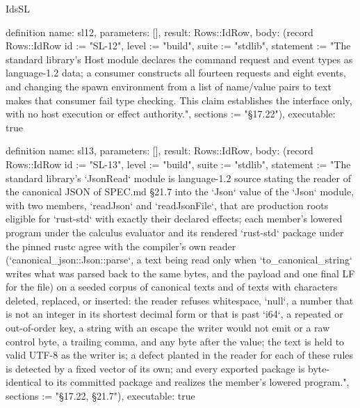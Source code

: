 \begin{lexlean}{IdsSL}
\begin{semanticmodule}
definition{
  name: sl12,
  parameters: [],
  result: Rows::IdRow,
  body: (record Rows::IdRow {id := "SL-12", level := "build", suite := "stdlib", statement := "The standard library's Host module declares the command request and event types as language-1.2 data; a consumer constructs all fourteen requests and eight events, and changing the spawn environment from a list of name/value pairs to text makes that consumer fail type checking. This claim establishes the interface only, with no host execution or effect authority.", sections := "§17.22"}),
  executable: true
}

definition{
  name: sl13,
  parameters: [],
  result: Rows::IdRow,
  body: (record Rows::IdRow {id := "SL-13", level := "build", suite := "stdlib", statement := "The standard library's `JsonRead` module is language-1.2 source stating the reader of the canonical JSON of SPEC.md §21.7 into the `Json` value of the `Json` module, with two members, `readJson` and `readJsonFile`, that are production roots eligible for `rust-std` with exactly their declared effects; each member's lowered program under the calculus evaluator and its rendered `rust-std` package under the pinned rustc agree with the compiler's own reader (`canonical_json::Json::parse`, a text being read only when `to_canonical_string` writes what was parsed back to the same bytes, and the payload and one final LF for the file) on a seeded corpus of canonical texts and of texts with characters deleted, replaced, or inserted: the reader refuses whitespace, `null`, a number that is not an integer in its shortest decimal form or that is past `i64`, a repeated or out-of-order key, a string with an escape the writer would not emit or a raw control byte, a trailing comma, and any byte after the value; the text is held to valid UTF-8 as the writer is; a defect planted in the reader for each of these rules is detected by a fixed vector of its own; and every exported package is byte-identical to its committed package and realizes the member's lowered program.", sections := "§17.22, §21.7"}),
  executable: true
}


\end{semanticmodule}
\end{lexlean}
